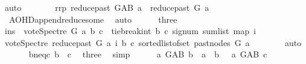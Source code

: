 \begin{isabellebody}
\ auto\isanewline
\ \ \ \ \isamarkupfalse%
\ \isamarkupfalse%
\ rrp{\isacharcolon}{\kern0pt}\ {\isachardoublequoteopen}reduce{\isacharunderscore}{\kern0pt}past\ G{\isacharunderscore}{\kern0pt}AB\ a\ {\isacharequal}{\kern0pt}\ reduce{\isacharunderscore}{\kern0pt}past\ G\ a{\isachardoublequoteclose}\ \isamarkupfalse%
\ {}{\isacharparenleft}{\kern0pt}{}{\isacharparenright}{\kern0pt}\ AOHD{\isachardot}{\kern0pt}append{\isacharunderscore}{\kern0pt}reduce{\isacharunderscore}{\kern0pt}some\ \isamarkupfalse%
\ auto\isanewline
\ \ \ \ \isamarkupfalse%
\ three\isanewline
\ \ \ \ \isamarkupfalse%
\ \isamarkupfalse%
\ ins{\isacharcolon}{\kern0pt}\ {\isachardoublequoteopen}\ vote{\isacharunderscore}{\kern0pt}Spectre\ G\ a\ b\ c\ {\isacharequal}{\kern0pt}\ {\isacharparenleft}{\kern0pt}tie{\isacharunderscore}{\kern0pt}break{\isacharunderscore}{\kern0pt}int\ b\ c\ {\isacharparenleft}{\kern0pt}signum\ {\isacharparenleft}{\kern0pt}sum{\isacharunderscore}{\kern0pt}list\ {\isacharparenleft}{\kern0pt}map\ {\isacharparenleft}{\kern0pt}{\isasymlambda}i{\isachardot}{\kern0pt}\isanewline
\ {\isacharparenleft}{\kern0pt}vote{\isacharunderscore}{\kern0pt}Spectre\ {\isacharparenleft}{\kern0pt}reduce{\isacharunderscore}{\kern0pt}past\ G\ a{\isacharparenright}{\kern0pt}\ i\ b\ c{\isacharparenright}{\kern0pt}{\isacharparenright}{\kern0pt}\ {\isacharparenleft}{\kern0pt}sorted{\isacharunderscore}{\kern0pt}list{\isacharunderscore}{\kern0pt}of{\isacharunderscore}{\kern0pt}set\ {\isacharparenleft}{\kern0pt}past{\isacharunderscore}{\kern0pt}nodes\ G\ a{\isacharparenright}{\kern0pt}{\isacharparenright}{\kern0pt}{\isacharparenright}{\kern0pt}{\isacharparenright}{\kern0pt}{\isacharparenright}{\kern0pt}{\isacharparenright}{\kern0pt}{\isachardoublequoteclose}\isanewline
\ \ \ \ \ \ \isamarkupfalse%
\ auto\isanewline
\ \ \ \ \isamarkupfalse%
\ \ bneqc{\isacharcolon}{\kern0pt}\ {\isachardoublequoteopen}b\ {\isasymnoteq}\ c{\isachardoublequoteclose}\ \isamarkupfalse%
\ three\ \isamarkupfalse%
\ simp\isanewline
\ \ \ \ \isamarkupfalse%
\ {\isachardoublequoteopen}{\isasymnot}{\isacharparenleft}{\kern0pt}{\isacharparenleft}{\kern0pt}a\ {\isasymrightarrow}\isactrlsup {\isacharplus}{\kern0pt}\isactrlbsub G{\isacharunderscore}{\kern0pt}AB\isactrlesub \ b\ {\isasymor}\ a\ {\isacharequal}{\kern0pt}\ b{\isacharparenright}{\kern0pt}\ {\isasymand}\ {\isacharparenleft}{\kern0pt}{\isasymnot}\ a\ {\isasymrightarrow}\isactrlsup {\isacharplus}{\kern0pt}\isactrlbsub G{\isacharunderscore}{\kern0pt}AB\isactrlesub \ c{\isacharparenright}{\kern0pt}{\isacharparenright}{\kern0pt}{\isachardoublequoteclose}\ \isanewline

\end{isabellebody}
